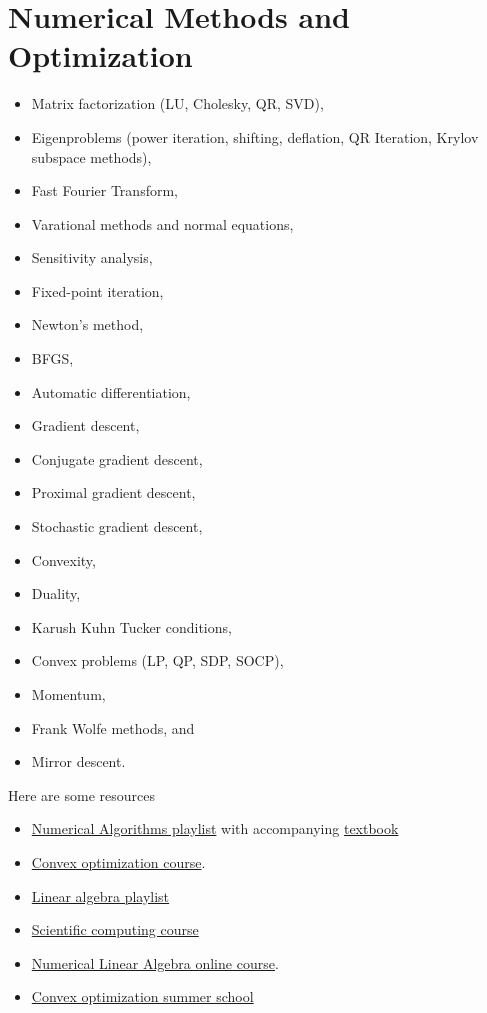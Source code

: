 \hypertarget{numerical-methods-and-optimization}{%
\section{Numerical Methods and
Optimization}\label{numerical-methods-and-optimization}}

\begin{itemize}
\tightlist
\item
  Matrix factorization (LU, Cholesky, QR, SVD),
\item
  Eigenproblems (power iteration, shifting, deflation, QR Iteration,
  Krylov subspace methods),
\item
  Fast Fourier Transform,
\item
  Varational methods and normal equations,
\item
  Sensitivity analysis,
\item
  Fixed-point iteration,
\item
  Newton's method,
\item
  BFGS,
\item
  Automatic differentiation,
\item
  Gradient descent,
\item
  Conjugate gradient descent,
\item
  Proximal gradient descent,
\item
  Stochastic gradient descent,
\item
  Convexity,
\item
  Duality,
\item
  Karush Kuhn Tucker conditions,
\item
  Convex problems (LP, QP, SDP, SOCP),
\item
  Momentum,
\item
  Frank Wolfe methods, and
\item
  Mirror descent.
\end{itemize}

Here are some resources

\begin{itemize}
\tightlist
\item
  \href{https://www.youtube.com/playlist?list=PLHrg69yaUAPeiLEsa-1KauSe2HaA0Wf6I}{Numerical
  Algorithms playlist} with accompanying
  \href{https://people.csail.mit.edu/jsolomon/share/book/numerical_book.PLE7DDD91010BC51F8}{textbook}
\item
  \href{https://youtube.com/playlist?list=PLRPU00LaonXQ27RBcq6jFJnyIbGw5azOI}{Convex
  optimization course}.
\item
  \href{https://www.youtube.com/playlist?list=PLMrJAkhIeNNRjxJ_sMtJ02geqw_-vuB7O}{Linear
  algebra playlist}
\item
  \href{https://www.youtube.com/playlist?list=PLMrJAkhIeNNRTVrHYDfjNyqzZ6Q6rsTyf}{Scientific
  computing course}
\item
  \href{https://www.cs.utexas.edu/users/flame/laff/alaff-beta/ALAFF.html}{Numerical
  Linear Algebra online course}.
\item
  \href{https://www.youtube.com/playlist?list=PLAPSKVSdi0oZPbS-UD_kwT4ePZQx_CiME}{Convex
  optimization summer school}
\end{itemize}
